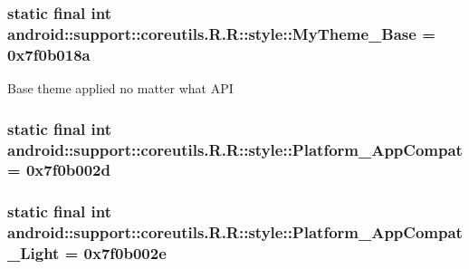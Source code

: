 \hypertarget{classandroid_1_1support_1_1coreutils_1_1_r_1_1style_22c5faf2bf11ee9caa149bb63fe793c8}{
\subsubsection[{MyTheme\_\-Base}]{\setlength{\rightskip}{0pt plus 5cm}static final int android::support::coreutils.R.R::style::MyTheme\_\-Base = 0x7f0b018a}}
\label{classandroid_1_1support_1_1coreutils_1_1_r_1_1style_22c5faf2bf11ee9caa149bb63fe793c8}


Base theme applied no matter what API \hypertarget{classandroid_1_1support_1_1coreutils_1_1_r_1_1style_3551a4fd0023bcc8738261f403ea82d4}{
\subsubsection[{Platform\_\-AppCompat}]{\setlength{\rightskip}{0pt plus 5cm}static final int android::support::coreutils.R.R::style::Platform\_\-AppCompat = 0x7f0b002d}}
\label{classandroid_1_1support_1_1coreutils_1_1_r_1_1style_3551a4fd0023bcc8738261f403ea82d4}


\hypertarget{classandroid_1_1support_1_1coreutils_1_1_r_1_1style_e18f29ea3cabb0419bb8570c3526c98c}{
\subsubsection[{Platform\_\-AppCompat\_\-Light}]{\setlength{\rightskip}{0pt plus 5cm}static final int android::support::coreutils.R.R::style::Platform\_\-AppCompat\_\-Light = 0x7f0b002e}}
\label{classandroid_1_1support_1_1coreutils_1_1_r_1_1style_e18f29ea3cabb0419bb8570c3526c98c}


